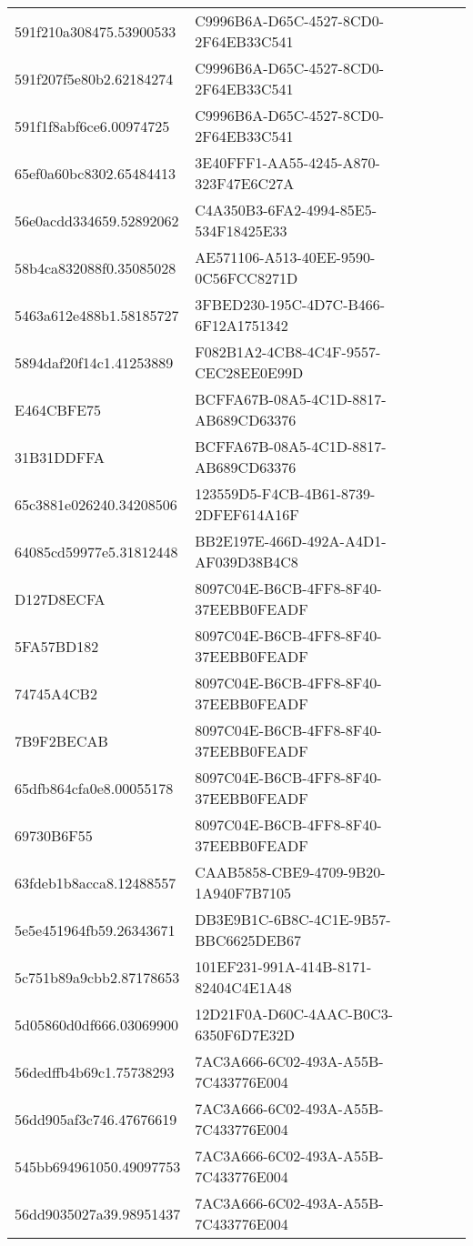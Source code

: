 \begin{tabular}{ll}
591f210a308475.53900533 & C9996B6A-D65C-4527-8CD0-2F64EB33C541 \\
591f207f5e80b2.62184274 & C9996B6A-D65C-4527-8CD0-2F64EB33C541 \\
591f1f8abf6ce6.00974725 & C9996B6A-D65C-4527-8CD0-2F64EB33C541 \\
65ef0a60bc8302.65484413 & 3E40FFF1-AA55-4245-A870-323F47E6C27A \\
56e0acdd334659.52892062 & C4A350B3-6FA2-4994-85E5-534F18425E33 \\
58b4ca832088f0.35085028 & AE571106-A513-40EE-9590-0C56FCC8271D \\
5463a612e488b1.58185727 & 3FBED230-195C-4D7C-B466-6F12A1751342 \\
5894daf20f14c1.41253889 & F082B1A2-4CB8-4C4F-9557-CEC28EE0E99D \\
E464CBFE75 & BCFFA67B-08A5-4C1D-8817-AB689CD63376 \\
31B31DDFFA & BCFFA67B-08A5-4C1D-8817-AB689CD63376 \\
65c3881e026240.34208506 & 123559D5-F4CB-4B61-8739-2DFEF614A16F \\
64085cd59977e5.31812448 & BB2E197E-466D-492A-A4D1-AF039D38B4C8 \\
D127D8ECFA & 8097C04E-B6CB-4FF8-8F40-37EEBB0FEADF \\
5FA57BD182 & 8097C04E-B6CB-4FF8-8F40-37EEBB0FEADF \\
74745A4CB2 & 8097C04E-B6CB-4FF8-8F40-37EEBB0FEADF \\
7B9F2BECAB & 8097C04E-B6CB-4FF8-8F40-37EEBB0FEADF \\
65dfb864cfa0e8.00055178 & 8097C04E-B6CB-4FF8-8F40-37EEBB0FEADF \\
69730B6F55 & 8097C04E-B6CB-4FF8-8F40-37EEBB0FEADF \\
63fdeb1b8acca8.12488557 & CAAB5858-CBE9-4709-9B20-1A940F7B7105 \\
5e5e451964fb59.26343671 & DB3E9B1C-6B8C-4C1E-9B57-BBC6625DEB67 \\
5c751b89a9cbb2.87178653 & 101EF231-991A-414B-8171-82404C4E1A48 \\
5d05860d0df666.03069900 & 12D21F0A-D60C-4AAC-B0C3-6350F6D7E32D \\
56dedffb4b69c1.75738293 & 7AC3A666-6C02-493A-A55B-7C433776E004 \\
56dd905af3c746.47676619 & 7AC3A666-6C02-493A-A55B-7C433776E004 \\
545bb694961050.49097753 & 7AC3A666-6C02-493A-A55B-7C433776E004 \\
56dd9035027a39.98951437 & 7AC3A666-6C02-493A-A55B-7C433776E004 \\

\end{tabular}
